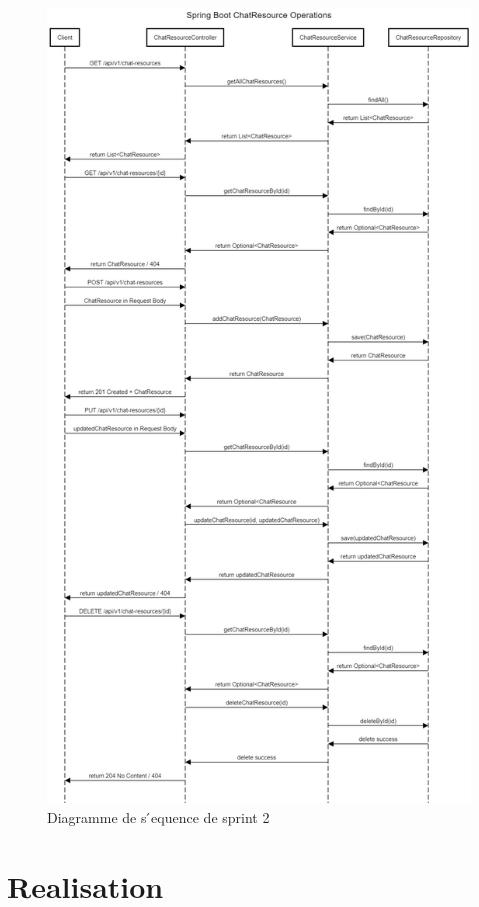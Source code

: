 \documentclass[a4paper, 11pt, openany]{report}
\begin{document}
\begin{figure}[H]
\centering
\includegraphics[width=\textwidth]{chat-res-seq.png} 
\caption{Diagramme de s ́equence de sprint 2
}
\label{fig:chatres_seq}
\end{figure}

\section{Realisation}
\end{document}
